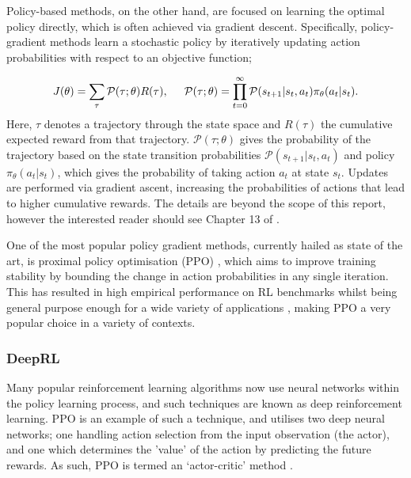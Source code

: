 \documentclass{article}
\begin{document}
Policy-based methods, on the other hand, are focused on learning the optimal policy directly, which is often achieved via gradient descent. Specifically, policy-gradient methods learn a stochastic policy by iteratively updating action probabilities with respect to an objective function;

\begin{align}
\label{eq: objective function}
    J(\theta) = \sum_{\tau} \mathcal{P}(\tau;\theta) R(\tau), \hspace{0.5cm} \mathcal{P}(\tau;\theta) = \prod_{t = 0}^{\infty} \mathcal{P}(s_{t+1}|s_t, a_t)\pi_{\theta}(a_t | s_t).
\end{align}
Here, $\tau$ denotes a trajectory through the state space and $R(\tau)$ the cumulative expected reward from that trajectory. $\mathcal{P}(\tau;\theta)$ gives the probability of the trajectory based on the state transition probabilities $\mathcal{P}(s_{t+1}|s_t, a_t)$ and policy $\pi_{\theta}(a_t | s_t)$, which gives the probability of taking action $a_t$ at state $s_t$. Updates are performed via gradient ascent, increasing the probabilities of actions that lead to higher cumulative rewards. The details are beyond the scope of this report, however the interested reader should see Chapter 13 of \cite{sutton2018reinforcement}.

One of the most popular policy gradient methods, currently hailed as state of the art, is proximal policy optimisation (PPO) \cite{schulman2017proximal}, which aims to improve training stability by bounding the change in action probabilities in any single iteration. This has resulted in high empirical performance on RL benchmarks whilst being general purpose enough for a wide variety of applications \cite{ppofacts}, making PPO a very popular choice in a variety of contexts. 


\subsubsection{DeepRL}

Many popular reinforcement learning algorithms now use neural networks within the policy learning process, and such techniques are known as deep reinforcement learning. PPO is an example of such a technique, and utilises two deep neural networks; one handling action selection from the input observation (the actor), and one which determines the 'value' of the action by predicting the future rewards. As such, PPO is termed an `actor-critic' method \cite{schulman2017proximal}.
\end{document}
